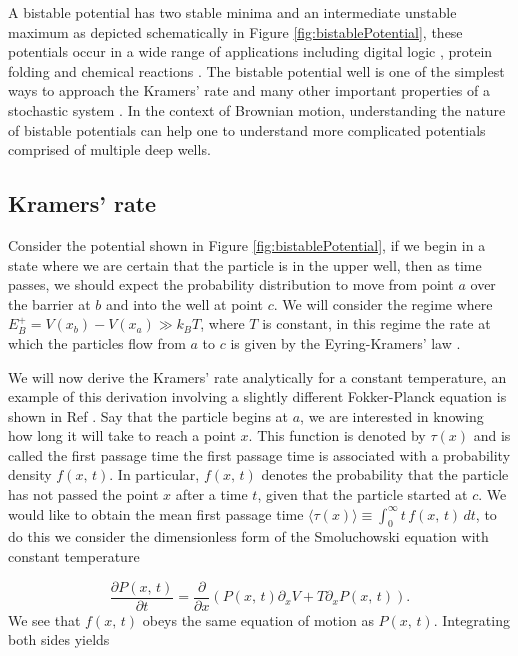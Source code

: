 A bistable potential has two stable minima and an intermediate unstable maximum as depicted schematically in Figure \ref{fig:bistablePotential}, these potentials occur in a wide range of applications including digital logic \cite{MyersCelebranoKrishnan2015,Landauer1961}, protein folding \cite{BryngelsonWolynes1989} and chemical reactions \cite{BernePecora1976}. The bistable potential well is one of the simplest ways to approach the Kramers' rate and many other important properties of a stochastic system \cite{MyersCelebranoKrishnan2015,Barcilon1996,SantamariaHolekGadomskiRubi2011}. In the context of Brownian motion, understanding the nature of bistable potentials can help one to understand more complicated potentials comprised of multiple deep wells.

\subsection{Kramers' rate} \label{kramersRate}
Consider the potential shown in Figure \ref{fig:bistablePotential}, if we begin in a state where we are certain that the particle is in the upper well, then as time passes, we should expect the probability distribution to move from point $a$ over the barrier at $b$ and into the well at point $c$. We will consider the regime where $E^+_B = V(x_b) - V(x_a) \gg k_B T$, where $T$ is constant, in this regime the rate at which the particles flow from $a$ to $c$ is given by the Eyring-Kramers' law \cite{Eyring1935, Kramers1940}.

We will now derive the Kramers' rate analytically for a constant temperature, an example of this derivation involving a slightly different Fokker-Planck equation is shown in Ref \cite{Gardiner2009}. Say that the particle begins at $a$, we are interested in knowing how long it will take to reach a point $x$. This function is denoted by $\tau(x)$ and is called the first passage time \cite{Gardiner2009} the first passage time is associated with a probability density $f(x, \, t)$. In particular, $f(x, \, t)$ denotes the probability that the particle has not passed the point $x$ after a time $t$, given that the particle started at $c$. We would like to obtain the mean first passage time $\langle \tau(x) \rangle \equiv \int_0^{\infty} t \, f(x, \, t) \, dt$, to do this we consider the dimensionless form of the Smoluchowski equation with constant temperature

\begin{equation}
\frac{\partial P(x, \, t)}{\partial t} = \frac{\partial}{\partial x} \left(P(x, \, t) \partial_x V + T \partial_x P(x, \, t) \right).
\end{equation}
We see that $f(x, \, t)$ obeys the same equation of motion as $P(x, \, t)$. Integrating both sides yields

